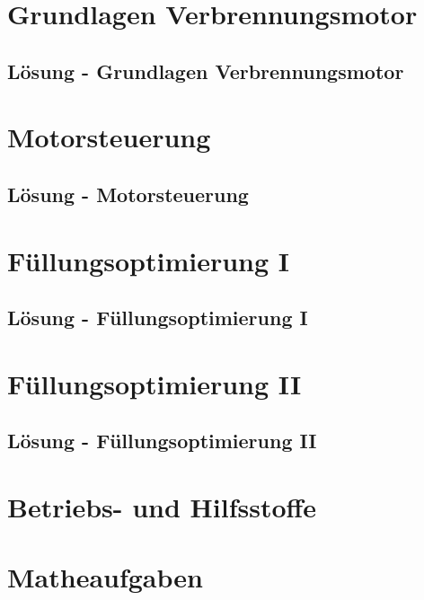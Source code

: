 


\chapter{Grundlagen Verbrennungsmotor}
 \newpage
\section{Lösung - Grundlagen Verbrennungsmotor}

\chapter{Motorsteuerung}
 \newpage
\section{Lösung - Motorsteuerung}

\chapter{Füllungsoptimierung I}
 \newpage
\section{Lösung - Füllungsoptimierung I}

\chapter{Füllungsoptimierung II}
 \newpage
\section{Lösung - Füllungsoptimierung II}

\chapter{Betriebs- und Hilfsstoffe}
 \newpage





\chapter{Matheaufgaben}
 \newpage
 \newpage




